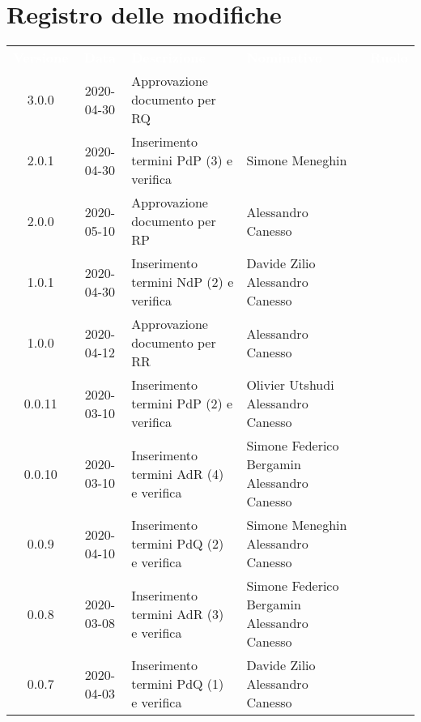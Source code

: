 \section*{Registro delle modifiche}
{
	\centering
	\begin{longtable}{ c c  C{4cm} C{3cm} C{3.5cm} }
		\textcolor{white}{\textbf{Versione}} & \textcolor{white}{\textbf{Data}} & \textcolor{white}{\textbf{Descrizione}} & \textcolor{white}{\textbf{Nominativo}} & \textcolor{white}{\textbf{Ruolo}}\\	
		3.0.0 & 2020-04-30 & Approvazione documento per RQ &  &\RdP{}\\	
		2.0.1 & 2020-04-30 & Inserimento termini PdP (3) e verifica & Simone Meneghin \newline  &\ana{} \newline \ver{} \\
		2.0.0 & 2020-05-10 & Approvazione documento per RP & Alessandro Canesso &\RdP{}\\
		1.0.1 & 2020-04-30 & Inserimento termini NdP (2) e verifica & Davide Zilio \newline Alessandro Canesso &\ana{} \newline \ver{} \\
		1.0.0 & 2020-04-12 & Approvazione documento per RR& Alessandro Canesso &\RdP{}\\
		0.0.11 & 2020-03-10 & Inserimento termini PdP (2) e verifica & Olivier Utshudi \newline Alessandro Canesso &\ana{} \newline \ver{} \\
		0.0.10 & 2020-03-10 & Inserimento termini AdR (4) e verifica & Simone Federico Bergamin \newline Alessandro Canesso &\ana{} \newline \ver{} \\
		0.0.9 & 2020-04-10 & Inserimento termini PdQ (2) e verifica & Simone Meneghin \newline Alessandro Canesso &\ana{} \newline \ver{} \\
		0.0.8 & 2020-03-08 & Inserimento termini AdR (3) e verifica & Simone Federico Bergamin \newline Alessandro Canesso &\ana{} \newline \ver{} \\
		0.0.7 & 2020-04-03 & Inserimento termini PdQ (1) e verifica & Davide Zilio \newline Alessandro Canesso &\ana{} \newline \ver{} \\

\end{longtable}}
